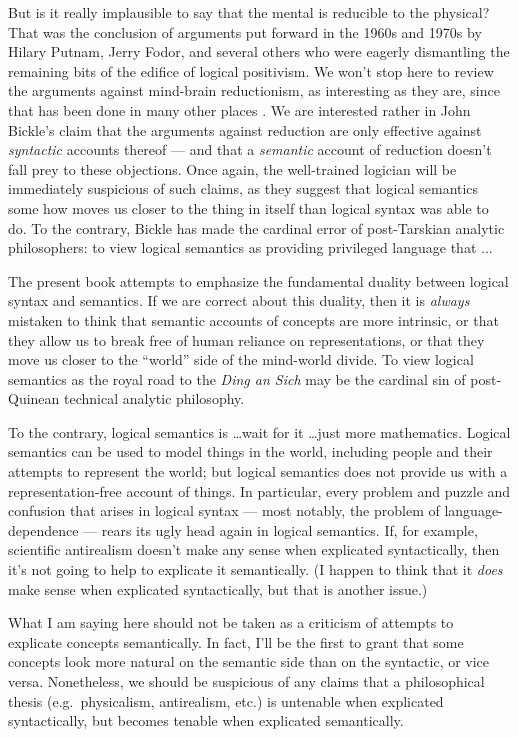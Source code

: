 But is it really implausible to say that the mental is reducible to
the physical?  That was the conclusion of arguments put forward in the
1960s and 1970s by Hilary Putnam, Jerry Fodor, and several others who
were eagerly dismantling the remaining bits of the edifice of logical
positivism.  We won't stop here to review the arguments against
mind-brain reductionism, as interesting as they are, since that has
been done in many other places \citep[see][]{bickle-sep}.  We are
interested rather in John Bickle's \citeyearpar{bickle} claim that the
arguments against reduction are only effective against {\it syntactic}
accounts thereof --- and that a {\it semantic} account of reduction
doesn't fall prey to these objections.  Once again, the well-trained
logician will be immediately suspicious of such claims, as they
suggest that logical semantics some how moves us closer to the thing
in itself than logical syntax was able to do.  To the contrary, Bickle
has made the cardinal error of post-Tarskian analytic philosophers: to
view logical semantics as providing privileged language that ...

The present book attempts to emphasize the fundamental duality between
logical syntax and semantics.  If we are correct about this duality,
then it is {\it always} mistaken to think that semantic accounts of
concepts are more intrinsic, or that they allow us to break free of
human reliance on representations, or that they move us closer to the
``world'' side of the mind-world divide.  To view logical semantics as
the royal road to the {\it Ding an Sich} may be the cardinal sin of
post-Quinean technical analytic philosophy.

To the contrary, logical semantics is \dots wait for it \dots just
more mathematics.  Logical semantics can be used to model things in
the world, including people and their attempts to represent the world;
but logical semantics does not provide us with a representation-free
account of things. In particular, every problem and puzzle and
confusion that arises in logical syntax --- most notably, the problem
of language-dependence --- rears its ugly head again in logical
semantics.  If, for example, scientific antirealism doesn't make any
sense when explicated syntactically, then it's not going to help to
explicate it semantically.  (I happen to think that it {\it does} make
sense when explicated syntactically, but that is another issue.)

What I am saying here should not be taken as a criticism of attempts
to explicate concepts semantically.  In fact, I'll be the first to
grant that some concepts look more natural on the semantic side than
on the syntactic, or vice versa.  Nonetheless, we should be suspicious
of any claims that a philosophical thesis (e.g.\ physicalism,
antirealism, etc.) is untenable when explicated syntactically, but
becomes tenable when explicated semantically.

